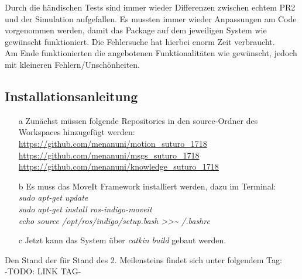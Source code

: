 \documentclass{suturo}
\begin{document}
Durch die händischen Tests sind immer wieder Differenzen zwischen echtem PR2 und der Simulation aufgefallen. Es mussten immer wieder Anpassungen am Code vorgenommen werden, damit das Package auf dem jeweiligen System wie gewünscht funktioniert. Die Fehlersuche hat hierbei enorm Zeit verbraucht. \\

Am Ende funktionierten die angebotenen Funktionalitäten wie gewünscht, jedoch mit kleineren Fehlern/Unschönheiten.\\

\subsection{Installationsanleitung}

\begin{itemize}
\item[a] Zunächst müssen folgende Repositories in den source-Ordner des Workspaces hinzugefügt werden:  \\
\url{https://github.com/menanuni/motion_suturo_1718} \\
\url{https://github.com/menanuni/msgs_suturo_1718} \\
\url{https://github.com/menanuni/knowledge_suturo_1718} \\

\item[b] Es muss das MoveIt Framework installiert werden, dazu im Terminal: \\
\textit{sudo apt-get update} \\
\textit{sudo apt-get install ros-indigo-moveit} \\
\textit{echo  \grqq{}source /opt/ros/indigo/setup.bash\grqq{} \textgreater\textgreater \textasciitilde{ }/.bashrc} \\

\item[c] Jetzt kann das System über \textit{catkin build} gebaut werden.
\end{itemize}

Den Stand der für Stand  des 2. Meilensteins findet sich unter folgendem Tag: \\
-TODO: LINK TAG-
\end{document}
